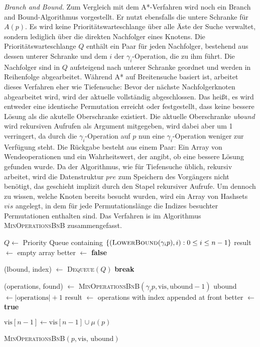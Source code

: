 \documentclass[a4paper, 10pt, ngerman]{article}
\begin{document}
\emph{Branch and Bound.} Zum Vergleich mit dem A*-Verfahren wird noch ein Branch and Bound-Algorithmus vorgestellt. Er nutzt ebensfalls die untere Schranke für $A(p)$. Es wird keine Prioritätswarteschlange über alle Äste der Suche verwaltet, sondern lediglich über die direkten Nachfolger eines Knotens. Die Prioritätswarteschlange $Q$ enthält ein Paar für jeden Nachfolger, bestehend aus dessen unterer Schranke und dem $i$ der $\gamma_i$-Operation, die zu ihm führt. Die Nachfolger sind in $Q$ aufsteigend nach unterer Schranke geordnet und werden in Reihenfolge abgearbeitet. Während A* auf Breitensuche basiert ist, arbeitet dieses Verfahren eher wie Tiefensuche: Bevor der nächste Nachfolgerknoten abgearbeitet wird, wird der aktuelle vollständig abgeschlossen. Das heißt, es wird entweder eine identische Permutation erreicht oder festgestellt, dass keine bessere Lösung als die akutelle Oberschranke existiert. Die aktuelle Oberschranke \emph{ubound} wird rekursiven Aufrufen als Argument mitgegeben, wird dabei aber um 1 verringert, da durch die $\gamma_i$-Operation auf $p$ nun eine $\gamma_i$-Operation weniger zur Verfügung steht. Die Rückgabe besteht aus einem Paar: Ein Array von Wendeoperationen und ein Wahrheitswert, der angibt, ob eine bessere Lösung gefunden wurde. Da der Algorithmus, wie für Tiefensuche üblich, rekursiv arbeitet, wird die Datenstruktur $pre$ zum Speichern des Vorgängers nicht benötigt, das geschieht implizit durch den Stapel rekursiver Aufrufe. Um dennoch zu wissen, welche Knoten bereits besucht wurden, wird ein Array von Hashsets $vis$ angelegt, in dem für jede Permutationslänge die Indizes besuchter Permutationen enthalten sind. Das Verfahren is im Algorithmus \textsc{MinOperationsBnB} zusammengefasst.

\begin{algorithm}
    {
         \;
    }
    {
         \;
    }

    $Q \gets$ Priority Queue containing $\{(\textsc{LowerBound}(\gamma_i p), i) : 0 \le i \le n - 1\}$ \;
    result $\gets$ empty array \;
    better $\gets$ \textbf{false} \;

    {
        (lbound, index) $\gets$ \textsc{Dequeue}$(Q)$ \;
        {
            \textbf{break} \;
        }

        (operations, found) $\gets$ \textsc{MinOperationsBnB}$(\gamma_i p, \mathrm{vis}, \mathrm{ubound} - 1)$ \;
        {
            ubound $\gets |\text{operations}| + 1$ \;
            result $\gets$ operations with index appended at front \;
            better $\gets$ \textbf{true} \;
        }
    }

    $\text{vis}[n - 1] \gets \text{vis}[n - 1] \cup \mu(p)$ \;
     \;

    \caption{\textsc{MinOperationsBnB}$(p, \text{vis, ubound})$}
\end{algorithm}
\end{document}
